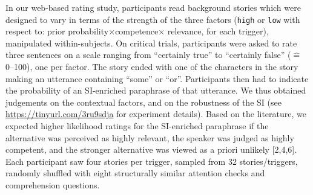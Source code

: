 \documentclass[11pt,letterpaper]{article}
\begin{document}
In our web-based rating study, participants read background stories which were designed to vary in terms of the strength of the three factors (\texttt{high} or \texttt{low} with respect to: prior probability$\times$competence$\times$ relevance, for each trigger), manipulated within-subjects.
On critical trials, participants were asked to rate three sentences on a scale ranging from ``certainly true'' to ``certainly false'' ($\widehat{=}$0--100), one per factor. 
The story ended with one of the characters in the story making an utterance containing ``some'' or ``or''. Participants then had to indicate the probability of an SI-enriched paraphrase of that utterance. 
We thus obtained judgements on the contextual factors, and on the robustness of the SI (see \url{https://tinyurl.com/3ru9sdja} for experiment details). 
Based on the literature, we expected higher likelihood ratings for the SI-enriched paraphrase if the alternative was perceived as highly relevant, the speaker was judged as highly competent, and the stronger alternative was viewed as a priori unlikely [2,4,6]. Each participant saw four stories per trigger, sampled from 32 stories/triggers, randomly shuffled with eight structurally similar attention checks and comprehension questions.
\end{document}

